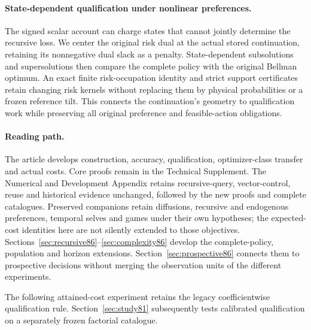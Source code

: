 \documentclass[ecta,nameyear,draft]{econsocart}
\begin{document}
\paragraph{State-dependent qualification under nonlinear preferences.}
The signed scalar account can charge states that cannot jointly determine the recursive loss. We center the original risk dual at the actual stored continuation, retaining its nonnegative dual slack as a penalty. State-dependent subsolutions and supersolutions then compare the complete policy with the original Bellman optimum. An exact finite risk-occupation identity and strict support certificates retain changing risk kernels without replacing them by physical probabilities or a frozen reference tilt. This connects the continuation's geometry to qualification work while preserving all original preference and feasible-action obligations.

\paragraph{Reading path.}
The article develops construction, accuracy, qualification, optimizer-class transfer and actual costs. Core proofs remain in the Technical Supplement. The Numerical and Development Appendix retains recursive-query, vector-control, reuse and historical evidence unchanged, followed by the new proofs and complete catalogues. Preserved companions retain diffusions, recursive and endogenous preferences, temporal selves and games under their own hypotheses; the expected-cost identities here are not silently extended to those objectives. Sections~\ref{sec:recursive86}--\ref{sec:complexity86} develop the complete-policy, population and horizon extensions. Section~\ref{sec:prospective86} connects them to prospective decisions without merging the observation units of the different experiments.


















\noindent The following attained-cost experiment retains the legacy coefficientwise qualification rule. Section~\ref{sec:study81} subsequently tests calibrated qualification on a separately frozen factorial catalogue.







\end{document}
